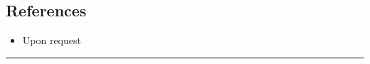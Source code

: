 \documentclass[10pt,letterpaper]{article}
\newenvironment{indentsection}[1]%
{\begin{list}{}%
	{\setlength{\leftmargin}{#1}}%
	\item[]%
}
{\end{list}}
\begin{document}
\subsection*{References}
\begin{indentsection}{\parindent}
\begin{itemize}
	\item Upon request
\end{itemize}
\end{indentsection}
\hrule
\end{document}
